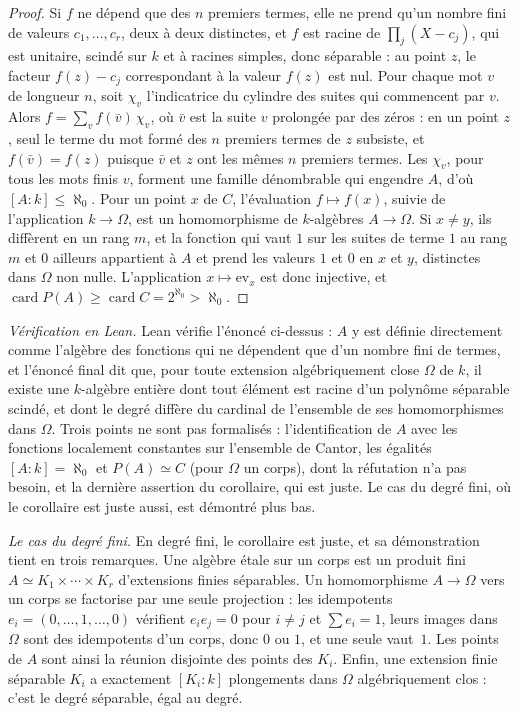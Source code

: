 \begin{proof}
Si $f$ ne dépend que des $n$ premiers termes, elle ne prend qu'un nombre fini de valeurs $c_1, \dots, c_r$, deux à deux distinctes, et $f$ est racine de $\prod_j (X - c_j)$, qui est unitaire, scindé sur $k$ et à racines simples, donc séparable : au point $z$, le facteur $f(z) - c_j$ correspondant à la valeur $f(z)$ est nul. Pour chaque mot $v$ de longueur $n$, soit $\chi_v$ l'indicatrice du cylindre des suites qui commencent par $v$. Alors $f = \sum_v f(\bar v)\, \chi_v$, où $\bar v$ est la suite $v$ prolongée par des zéros : en un point $z$, seul le terme du mot formé des $n$ premiers termes de $z$ subsiste, et $f(\bar v) = f(z)$ puisque $\bar v$ et $z$ ont les mêmes $n$ premiers termes. Les $\chi_v$, pour tous les mots finis $v$, forment une famille dénombrable qui engendre $A$, d'où $[A:k] \leq \aleph_0$. Pour un point $x$ de $C$, l'évaluation $f \mapsto f(x)$, suivie de l'application $k \to \Omega$, est un homomorphisme de $k$-algèbres $A \to \Omega$. Si $x \neq y$, ils diffèrent en un rang $m$, et la fonction qui vaut $1$ sur les suites de terme $1$ au rang $m$ et $0$ ailleurs appartient à $A$ et prend les valeurs $1$ et $0$ en $x$ et $y$, distinctes dans $\Omega$ non nulle. L'application $x \mapsto \mathrm{ev}_x$ est donc injective, et $\operatorname{card} P(A) \geq \operatorname{card} C = 2^{\aleph_0} > \aleph_0$.
\end{proof}

\emph{Vérification en Lean.} Lean vérifie l'énoncé ci-dessus : $A$ y est définie directement comme l'algèbre des fonctions qui ne dépendent que d'un nombre fini de termes, et l'énoncé final dit que, pour toute extension algébriquement close $\Omega$ de $k$, il existe une $k$-algèbre entière dont tout élément est racine d'un polynôme séparable scindé, et dont le degré diffère du cardinal de l'ensemble de ses homomorphismes dans $\Omega$. Trois points ne sont pas formalisés : l'identification de $A$ avec les fonctions localement constantes sur l'ensemble de Cantor, les égalités $[A:k] = \aleph_0$ et $P(A) \simeq C$ (pour $\Omega$ un corps), dont la réfutation n'a pas besoin, et la dernière assertion du corollaire, qui est juste. Le cas du degré fini, où le corollaire est juste aussi, est démontré plus bas.

\emph{Le cas du degré fini.} En degré fini, le corollaire est juste, et sa démonstration tient en trois remarques. Une algèbre étale sur un corps est un produit fini $A \simeq K_1 \times \cdots \times K_r$ d'extensions finies séparables. Un homomorphisme $A \to \Omega$ vers un corps se factorise par une seule projection : les idempotents $e_i = (0, \ldots, 1, \ldots, 0)$ vérifient $e_ie_j = 0$ pour $i \neq j$ et $\sum e_i = 1$, leurs images dans $\Omega$ sont des idempotents d'un corps, donc $0$ ou $1$, et une seule vaut~$1$. Les points de $A$ sont ainsi la réunion disjointe des points des $K_i$. Enfin, une extension finie séparable $K_i$ a exactement $[K_i : k]$ plongements dans $\Omega$ algébriquement clos : c'est le degré séparable, égal au degré.

